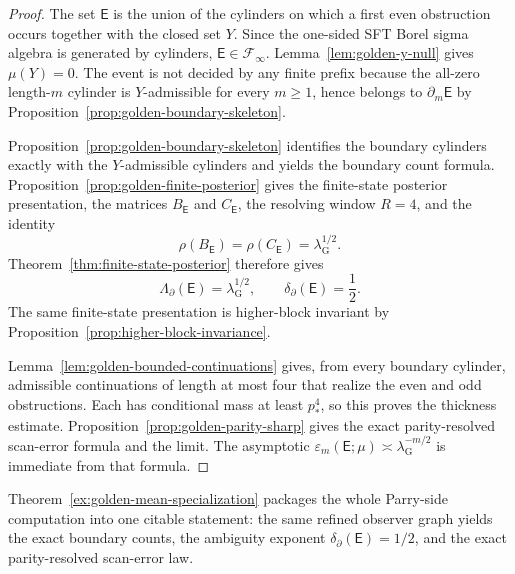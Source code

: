 \documentclass{etds}%
\numberwithin{equation}{section}
\theoremstyle{plain}
\theoremstyle{definition}
\theoremstyle{remark}
\begin{document}
\begin{proof}
The set $\mathsf{E}$ is the union of the cylinders on which a first even
obstruction occurs together with the closed set $Y$.  Since the one-sided SFT
Borel sigma algebra is generated by cylinders, $\mathsf{E}\in\mathcal{F}_\infty$.
Lemma~\ref{lem:golden-y-null} gives $\mu(Y)=0$.  The event is not decided by
any finite prefix because the all-zero length-$m$ cylinder is $Y$-admissible
for every $m\ge 1$, hence belongs to $\partial_m\mathsf{E}$ by
Proposition~\ref{prop:golden-boundary-skeleton}.

Proposition~\ref{prop:golden-boundary-skeleton} identifies the boundary
cylinders exactly with the $Y$-admissible cylinders and yields the boundary
count formula.  Proposition~\ref{prop:golden-finite-posterior} gives the
finite-state posterior presentation, the matrices $B_{\mathsf{E}}$ and
$C_{\mathsf{E}}$, the resolving window $R=4$, and the identity
\[
\rho(B_{\mathsf{E}})=\rho(C_{\mathsf{E}})=\lambda_{\mathrm G}^{1/2}.
\]
Theorem~\ref{thm:finite-state-posterior} therefore gives
\[
\Lambda_\partial(\mathsf{E})=\lambda_{\mathrm G}^{1/2},
\qquad
\delta_\partial(\mathsf{E})=\frac12.
\]
The same finite-state presentation is higher-block invariant by
Proposition~\ref{prop:higher-block-invariance}.

Lemma~\ref{lem:golden-bounded-continuations} gives, from every boundary
cylinder, admissible continuations of length at most four that realize the
even and odd obstructions.  Each has conditional mass at least $p_*^4$, so
this proves the thickness estimate.  Proposition~\ref{prop:golden-parity-sharp}
gives the exact parity-resolved scan-error formula and the limit.  The asymptotic
$\varepsilon_m(\mathsf{E};\mu)\asymp \lambda_{\mathrm G}^{-m/2}$ is immediate
from that formula.
\end{proof}

Theorem~\ref{ex:golden-mean-specialization} packages the whole Parry-side
computation into one citable statement: the same refined observer graph yields
the exact boundary counts, the ambiguity exponent
$\delta_\partial(\mathsf{E})=1/2$, and the exact parity-resolved scan-error
law.
\end{document}
